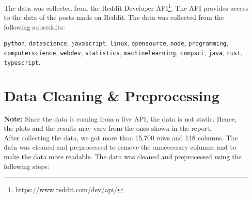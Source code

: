 \documentclass[12pt, letterpage]{article}
\begin{document}
The data was collected from the Reddit Developer API\footnote{https://www.reddit.com/dev/api/}. The API provides access to the data of the posts made on Reddit. The data was collected from the following subreddits: 

\texttt{python},
\texttt{datascience}, \texttt{javascript},
\texttt{linux}, \texttt{opensource}, \texttt{node},
\texttt{programming}, \texttt{computerscience},
\texttt{webdev}, \texttt{statistics}, \texttt{machinelearning}, \texttt{compsci}, \texttt{java}, \texttt{rust}, \texttt{typescript}.

\section{Data Cleaning \& Preprocessing}

\textbf{Note:} Since the data is coming from a live API, the data is not static. Hence, the plots and the results may vary from the ones shown in the report. \\

After collecting the data, we got more than 15,700 rows and 118 columns. The data was cleaned and preprocessed to remove the unnecessary columns and to make the data more readable. The data was cleaned and preprocessed using the following steps:
\end{document}
